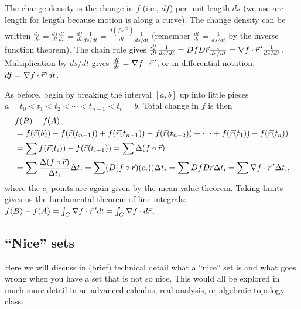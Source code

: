 The change density is the change in $f$ (i.e., $df$) per unit length
$ds$ (we use arc length for length because motion is along a
curve). The change density can be written $\frac{d f}{d s} = \frac
{df}{dt} \frac{dt}{ds}=\frac {df}{dt} \frac{1}{ds/dt}=\frac{d(f\circ \vec
  r)}{dt}\frac{1}{ds/dt}$ (remember $\frac {dt}{ds}=\frac{1}{ds/dt}$
by the inverse function theorem). The chain rule gives
$\frac{df}{dt}\frac 1 {ds/dt} = Df D\vec r \frac{1}{ds/dt} = \nabla f \cdot
\vec r^{\,\prime} \frac{1}{ds/dt}$. Multiplication by $ds/dt$ gives
$\frac{df}{dt} = \nabla f \cdot \vec r^{\,\prime}$, or in differential notation, $df = \nabla
f \cdot \vec r^{\,\prime} dt$.

As before, begin by breaking the interval $[a,b]$ up into little
pieces {$ a=t_0<t_1<t_2<\cdots <t_{n-1}<t_n=b $}.  Total change in $f$ is
then
\begin{align*}
&f(B)-f(A) \\
&= f(\vec r(b))-f(\vec r(t_{n-1})) + f(\vec r(t_{n-1}))-f(\vec
r(t_{n-2})) +\cdots + f(\vec r(t_{1}))-f(\vec r(t_{a})) \\
&= \sum f(\vec r(t_i)) - f(\vec r(t_{i-1})) 
= \sum\Delta (f\circ\vec r) \\
&= \sum\frac{\Delta(f\circ \vec r)}{ \Delta t_i}\Delta t_i  
= \sum (D(f\circ \vec r)(c_i)) \Delta t_i 
= \sum DfD\vec r \Delta t_i 
= \sum \nabla f\cdot \vec r^{\,\prime} \Delta t_i, 
\end{align*}
where the $c_i$ points are again given by the mean value theorem.  Taking
limits gives us the fundamental theorem of line integrals: $
f(B)-f(A)= \int_C \nabla f\cdot \vec r^{\,\prime} dt = \int_C\nabla f\cdot d\vec r $.

\subsection{``Nice'' sets}
\label{sec:nice-sets}

Here we will discuss in (brief) technical detail what a ``nice'' set
is and what goes wrong when you have a set that is not so nice.  This
would all be explored in much more detail in an advanced calculus, real
analysis, or algebraic topology class.

